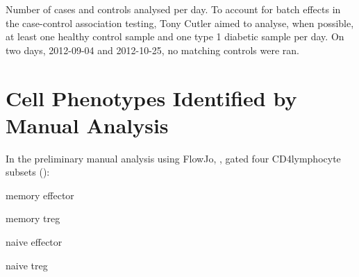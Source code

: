 { Number of cases and controls analysed per day. }
{
  To account for batch effects in the case-control association testing,
  Tony Cutler aimed to analyse, when possible,
  at least one healthy control sample and one type 1 diabetic sample per day.
  On two days, 2012-09-04 and 2012-10-25, no matching controls were ran.
}


\section{Cell Phenotypes Identified by Manual Analysis}

In the preliminary manual analysis using FlowJo, ,
gated four CD4\positive lymphocyte subsets ():
\begin{itemise}
  \item memory effector
  \item memory treg
  \item naive effector
  \item naive treg
\end{itemise}
% 
